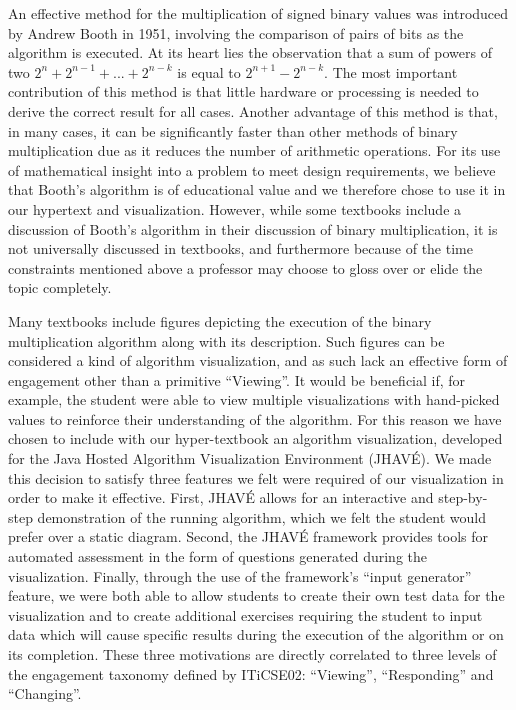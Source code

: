 \documentclass{acm_proc_article-sp}
\begin{document}
An effective method for the multiplication of signed binary values was introduced by Andrew Booth in 1951, involving the comparison of pairs of bits as the algorithm is executed.
At its heart lies the observation that a sum of powers of two $2^n + 2^{n-1} + ...
+ 2^{n-k}$ is equal to $2^{n+1} - 2^{n-k}$.
The most important contribution of this method is that little hardware or processing is needed to derive the correct result for all cases\cite{booth}.
Another advantage of this method is that, in many cases, it can be significantly faster than other methods of binary multiplication due as it reduces the number of arithmetic operations.\cite{text1}
For its use of mathematical insight into a problem to meet design requirements, we believe that Booth's algorithm is of educational value and we therefore chose to use it in our hypertext and visualization.
However, while some textbooks include a discussion of Booth's algorithm in their discussion of binary multiplication, it is not universally discussed in textbooks, and furthermore because of the time constraints mentioned above a professor may choose to gloss over or elide the topic completely.

Many textbooks include figures depicting the execution of the binary multiplication algorithm along with its description\cite{needsCitation}.
Such figures can be considered a kind of algorithm visualization, and as such lack an effective form of engagement other than a primitive ``Viewing''.
It would be beneficial if, for example, the student were able to view multiple visualizations with hand-picked values to reinforce their understanding of the algorithm.
For this reason we have chosen to include with our hyper-textbook an algorithm visualization, developed for the Java Hosted Algorithm Visualization Environment (JHAVÉ)\cite{JHAVE}.
We made this decision to satisfy three features we felt were required of our visualization in order to make it effective.
First, JHAVÉ allows for an interactive and step-by-step demonstration of the running algorithm, which we felt the student would prefer over a static diagram.
Second, the JHAVÉ framework provides tools for automated assessment in the form of questions generated during the visualization.
Finally, through the use of the framework's ``input generator'' feature, we were both able to allow students to create their own test data for the visualization and to create additional exercises requiring the student to input data which will cause specific results during the execution of the algorithm or on its completion.
These three motivations are directly correlated to three levels of the engagement taxonomy defined by ITiCSE02: ``Viewing'', ``Responding'' and ``Changing''.
\end{document}
